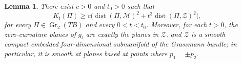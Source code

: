 \documentclass[11pt]{article}
\newtheorem{lemma}[theorem]{Lemma}
\theoremstyle{definition}
\theoremstyle{remark}
\newcommand{\cM}{\mathcal M}
\newcommand{\cZ}{\mathcal Z}
\newcommand{\Gr}{\operatorname{Gr}}
\newcommand{\dist}{\operatorname{dist}}
\begin{document}
\begin{lemma}                                                                       \label{lem:cheeger-lower-bound}
There exist $c>0$ and $t_0>0$ such that
\begin{equation}                                                                    \label{eq:cheeger-lower-bound}
 K_t(\Pi)\geq
 c\bigl(\dist(\Pi,\cM)^2+t^3\dist(\Pi,\cZ)^2\bigr),
\end{equation}
for every $\Pi\in\Gr_2(TB)$ and every $0<t<t_0$.  Moreover, for each
$t>0$, the zero-curvature planes of $g_t$ are exactly the planes in
$\cZ$, and $\cZ$ is a smooth compact embedded four-dimensional submanifold of the
Grassmann bundle; in particular, it is smooth at planes based at points where
$p_1=\pm p_2$.
\end{lemma}
\end{document}
